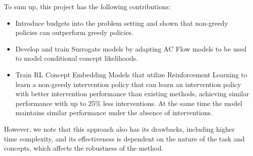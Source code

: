 To sum up, this project has the following contributions:
\begin{itemize}
    \item Introduce budgets into the problem setting and shown that non-greedy policies can outperform greedy policies.
    \item Develop and train Surrogate models by adapting AC Flow models to be used to model conditional concept likelihoods.
    \item Train RL Concept Embedding Models that utilize Reinforcement Learning
    to learn a non-greedy intervention policy that can learn an intervention policy
    with better intervention performance than existing methods, achieving similar performance
    with up to 25\% less interventions. At the same time the model maintains similar performance under 
the absence of interventions. 
\end{itemize}

However, we note that
this approach also has its drawbacks, including
higher time complexity, and its effectiveness is dependent on 
the nature of the task and concepts, which affects the robustness of the method.




